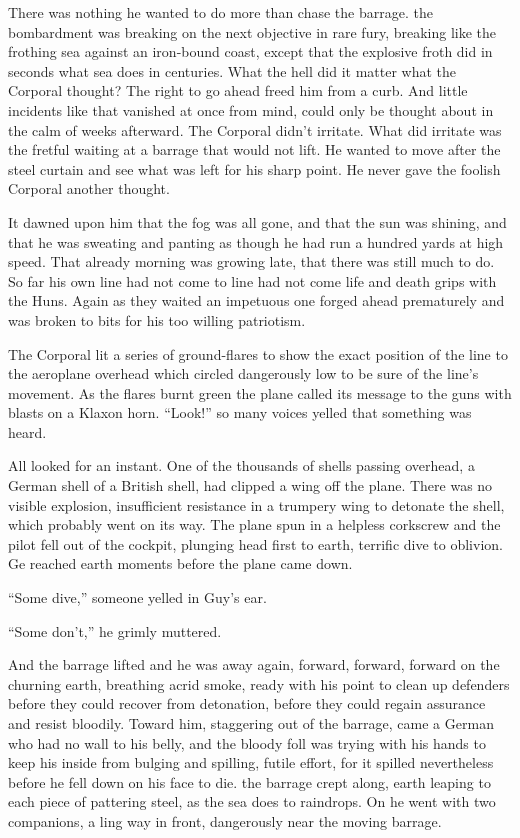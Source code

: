 There was nothing he wanted to do more than chase the barrage. the bombardment was breaking on the next objective in rare fury, breaking like the frothing sea against an iron-bound coast, except that the explosive froth did in seconds what sea does in centuries. What the hell did it matter what the Corporal thought? The right to go ahead freed him from a curb. And little incidents like that vanished at once from mind, could only be thought about in the calm of weeks afterward. The Corporal didn't irritate. What did irritate was the fretful waiting at a barrage that would not lift. He wanted to move after the steel curtain and see what was left for his sharp point. He never gave the foolish Corporal another thought.

It dawned upon him that the fog was all gone, and that the sun was shining, and that he was sweating and panting as though he had run a hundred yards at high speed. That already morning was growing late, that there was still much to do. So far his own line had not come to line had not come life and death grips with the Huns. Again as they waited an impetuous one forged ahead prematurely and was broken to bits for his too willing patriotism.

The Corporal lit a series of ground-flares to show the exact position of the line to the aeroplane overhead which circled dangerously low to be sure of the line's movement. As the flares burnt green the plane called its message to the guns with blasts on a Klaxon horn. ``Look!'' so many voices yelled that something was heard.

All looked for an instant. One of the thousands of shells passing overhead, a German shell of a British shell, had clipped a wing off the plane. There was no visible explosion, insufficient resistance in a trumpery wing to detonate the shell, which probably went on its way. The plane spun in a helpless corkscrew and the pilot fell out of the cockpit, plunging head first to earth, terrific dive to oblivion. Ge reached earth moments before the plane came down.

``Some dive,'' someone yelled in Guy's ear.

``Some don't,'' he grimly muttered.

And the barrage lifted and he was away again, forward, forward, forward on the churning earth, breathing acrid smoke, ready with his point to clean up defenders before they could recover from detonation, before they could regain assurance and resist bloodily. Toward him, staggering out of the barrage, came a German who had no wall to his belly, and the bloody foll was trying with his hands to keep his inside from bulging and spilling, futile effort, for it spilled nevertheless before he fell down on his face to die. the barrage crept along, earth leaping to each piece of pattering steel, as the sea does to raindrops. On he went with two companions, a ling way in front, dangerously near the moving barrage.

